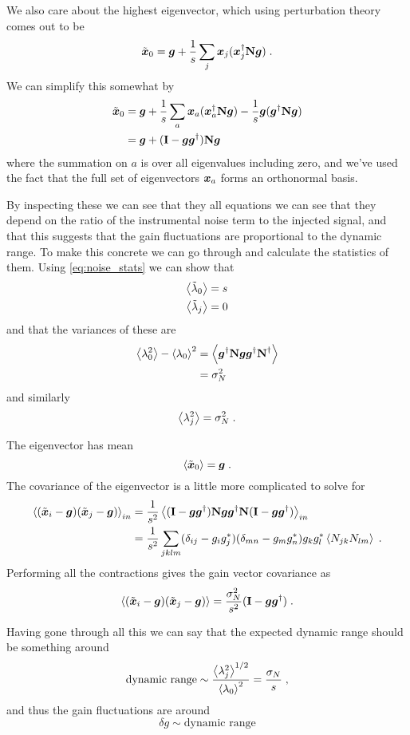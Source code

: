 \documentclass[oldfontcommands,letter,11pt,oneside,article]{memoir}
\begin{document}
We also care about the highest eigenvector, which using perturbation theory comes out to be
\begin{equation}
\tilde{\boldsymbol{x}}_0 = \boldsymbol{g} + \frac{1}{s} \sum_j \boldsymbol{x}_j ( \boldsymbol{x}_j^{\dagger} \boldsymbol{\mathbf{N}} \boldsymbol{g} ) \; .
\end{equation}
We can simplify this somewhat by
\begin{align}
\tilde{\boldsymbol{x}}_0 & = \boldsymbol{g} + \frac{1}{s} \sum_a \boldsymbol{x}_a ( \boldsymbol{x}_a^{\dagger} \boldsymbol{\mathbf{N}} \boldsymbol{g} ) - \frac{1}{s} \boldsymbol{g} ( \boldsymbol{g}^{\dagger} \boldsymbol{\mathbf{N}} \boldsymbol{g} )\\
& = \boldsymbol{g} + (\boldsymbol{\mathbf{I}} - \boldsymbol{g}\boldsymbol{g}^{\dagger}) \boldsymbol{\mathbf{N}} \boldsymbol{g}
\end{align}
where the summation on $a$ is over all eigenvalues including zero, and we've
used the fact that the full set of eigenvectors $\boldsymbol{x}_a$ forms an orthonormal
basis.

By inspecting these we can see that they all equations we can see that they
depend on the ratio of the instrumental noise term to the injected signal, and that this suggests that the gain fluctuations are proportional to the dynamic range. To make this concrete we can go through and calculate the statistics of them. Using \eqref{eq:noise_stats} we can show that
\begin{align}
\left\langle \tilde{\lambda}_0 \right\rangle & = s \\
\left\langle \tilde{\lambda}_j \right\rangle & = 0
\end{align}
and that the variances of these are
\begin{align}
\left\langle \lambda_0^2 \right\rangle - \left\langle \lambda_0 \right\rangle^2 & = \left\langle \boldsymbol{g}^{\dagger} \boldsymbol{\mathbf{N}} \boldsymbol{g} \boldsymbol{g}^{\dagger} \boldsymbol{\mathbf{N}}^{\dagger} \right\rangle \\
& = \sigma_N^2
\end{align}
and similarly
\begin{equation}
\left\langle \lambda_j^2 \right\rangle = \sigma_N^2 \; .
\end{equation}

The eigenvector has mean
\begin{equation}
\left\langle \tilde{\boldsymbol{x}}_0 \right\rangle = \boldsymbol{g} \; .
\end{equation}
The covariance of the eigenvector is a little more complicated to solve for
\begin{align}
\left\langle (\tilde{\boldsymbol{x}}_i - \boldsymbol{g}) (\tilde{\boldsymbol{x}}_j - \boldsymbol{g})\right\rangle_{in} &
= \frac{1}{s^2} \left\langle (\boldsymbol{\mathbf{I}} - \boldsymbol{g} \boldsymbol{g}^{\dagger} ) \boldsymbol{\mathbf{N}} \boldsymbol{g} \boldsymbol{g}^{\dagger} \boldsymbol{\mathbf{N}} (\boldsymbol{\mathbf{I}} - \boldsymbol{g} \boldsymbol{g}^{\dagger} ) \right\rangle_{in} \\
& = \frac{1}{s^2} \sum_{jklm} (\delta_{ij} - g_i g_j^*) (\delta_{mn} - g_m g_n^*) g_k g_l^* \left\langle N_{jk} N_{lm} \right\rangle \; .
\end{align}
Performing all the contractions gives the gain vector covariance as
\begin{equation}
\left\langle (\tilde{\boldsymbol{x}}_i - \boldsymbol{g}) (\tilde{\boldsymbol{x}}_j - \boldsymbol{g})\right\rangle = \frac{\sigma_N^2}{s^2} (\boldsymbol{\mathbf{I}} - \boldsymbol{g} \boldsymbol{g}^{\dagger} ) \; .
\end{equation}

Having gone through all this we can say that the expected dynamic range should be something around
\begin{equation}
\text{dynamic range} \sim \frac{\left\langle \lambda_j^2 \right\rangle^{1/2}}{\left\langle \lambda_0 \right\rangle^2} = \frac{\sigma_N}{s} \; ,
\end{equation}
and thus the gain fluctuations are around
\begin{equation}
\delta{g} \sim \text{dynamic range}
\end{equation}
\end{document}
